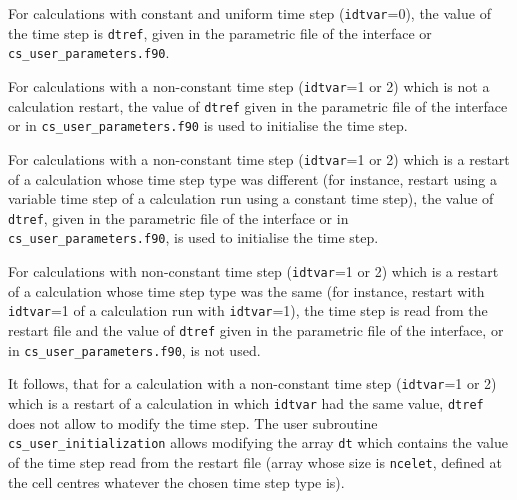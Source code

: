 {{{
\begin{list}{-}{}
\item For calculations with constant and uniform time step
      (\texttt{idtvar}=0), the value of the time step is \texttt{dtref},
      given in the parametric file of the interface or \texttt{cs\_user\_parameters.f90}.
\item For calculations with a non-constant time step
      (\texttt{idtvar}=1 or 2) which is not a calculation restart,
      the value of \texttt{dtref} given in the parametric file of the interface
      or in \texttt{cs\_user\_parameters.f90} is used to initialise the time step.
\item For calculations with a non-constant time step
      (\texttt{idtvar}=1 or 2) which is a restart of a
      calculation whose time step type was different (for instance, restart
      using a variable time step of a calculation run using a constant time
      step), the value of \texttt{dtref}, given in the parametric file of the
      interface or in \texttt{cs\_user\_parameters.f90}, is used to initialise the time step.
\item For calculations with non-constant time step
      (\texttt{idtvar}=1 or 2) which is a restart of a
      calculation whose time step type was the same (for instance, restart with
      \texttt{idtvar}=1 of a calculation run with \texttt{idtvar}=1), the time
      step is read from the restart file and the value of \texttt{dtref} given
      in the parametric file of the interface, or in \texttt{cs\_user\_parameters.f90}, is not used.
\end{list}
It follows, that for a calculation with a non-constant time step (\texttt{idtvar}=1
or 2) which is a restart of a calculation in which
\texttt{idtvar} had the same value, \texttt{dtref} does not allow to modify the
time step. The user subroutine \texttt{cs\_user\_initialization} allows modifying the array
\texttt{dt} which contains the value of the time step read from the restart file
(array whose size is \texttt{ncelet}, defined at the cell centres whatever the
chosen time step type is).

}}}

